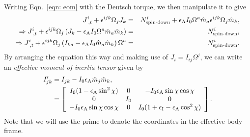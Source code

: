 \documentclass[../full_thesis/full_thesis.tex]{subfiles}
\begin{document}
Writing Eqn.~\eqref{eqn: eom} with the Deutsch torque, we then manipulate it to
give
\begin{eqnarray*}
J^{i}_{\;,t}+\epsilon^{ijk}\Omega_{j}J_{k} & =
& N^{i}_{\textrm{spin-down}}+
\epsilon_{\mathrm{A}} I_{0}\Omega^{a}\hat{m}_{a}\epsilon^{ijk}\Omega_{j}\hat{m}_{k}, \\
\Rightarrow J^{i}_{\;,t}+
\epsilon^{ijk}\Omega_{j}\left(J_{k}-\epsilon_{\mathrm{A}} I_{0}\Omega^{a}\hat{m}_{a}\hat{m}_{k}\right)
& = & N^{i}_{\textrm{spin-down}}, \\
\Rightarrow J^{i}_{\;,t}+
\epsilon^{ijk}\Omega_{j}\left(I_{ka}-\epsilon_{\mathrm{A}} I_{0}\hat{m}_{a}\hat{m}_{k}\right)\Omega^{a}
& = & N^{i}_{\textrm{spin-down}}.
\end{eqnarray*}
By arranging the equation this way and making use of $J_{i}=I_{ij}\Omega^{j}$,
we can write an \emph{effective moment of inertia tensor} given by
\begin{align}
\begin{split}
I'_{jk}&=I_{jk}-I_{0}\epsilon_{\mathrm{A}}\hat{m}_{j}\hat{m}_{k}, \\
&= \left[
\begin{array}{ccc}
I_{0}(1-\epsilon_{\mathrm{A}}\sin^{2}\chi) & 0 & -I_{0}\epsilon_{\mathrm{A}}\sin\chi \cos \chi \\
0 & I_{0} & 0 \\  -I_{0}\epsilon_{\mathrm{A}}\sin\chi \cos \chi& 0 &
I_{0}(1+\epsilon_{\mathrm{I}}-\epsilon_{\mathrm{A}}\cos^{2}\chi)
\end{array}
\right].
\end{split}
\label{eqn: effective MOI}
\end{align}
Note that we will use the prime to denote the coordinates in the
effective body frame.
\end{document}
